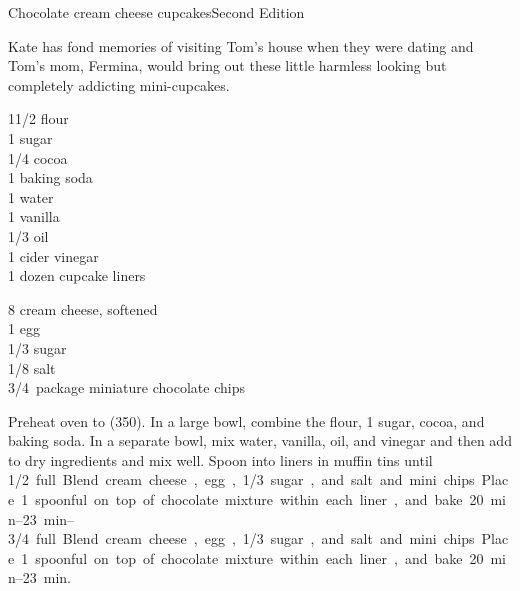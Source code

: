 \begin{entry}{Chocolate cream cheese cupcakes}{Second Edition}

\begin{open}
  Kate has fond memories of visiting Tom's house when they were dating and Tom's mom, Fermina, would bring out these little harmless looking but completely addicting mini-cupcakes.
\end{open}
\begin{ingredients}
    1\SI{1/2}{\cup} flour\\
    \SI{1}{\cup} sugar\\
    \SI{1/4}{\cup} cocoa\\
    \SI{1}{\teaspoon} baking soda\\
    \SI{1}{\cup} water\\
    \SI{1}{\teaspoon} vanilla\\
    \SI{1/3}{\cup} oil\\
    \SI{1}{\tblspoon} cider vinegar\\
    1 dozen cupcake liners
\end{ingredients}


\begin{ingredients}
    \SI{8}{\ounce} cream cheese, softened\\
    1 egg\\
    \SI{1/3}{\cup} sugar\\
    \SI{1/8}{\teaspoon} salt\\
    \SI{3/4}{package} miniature chocolate chips
\end{ingredients}
Preheat oven to (\SI{350}{\degreeF}). In a large bowl, combine the flour,
\SI{1}{\cup} sugar, cocoa, and baking soda. In a separate bowl, mix water,
vanilla, oil, and vinegar and then add to dry ingredients and mix well. Spoon
into liners in muffin tins until \SIrange{1/2}{3/4} full. Blend cream cheese,
egg, \SI{1/3}{\cup} sugar, and salt and mini chips. Place 1 spoonful on top of
chocolate mixture within each liner, and bake \SIrange{20}{23}{\minute}.
\end{entry}

